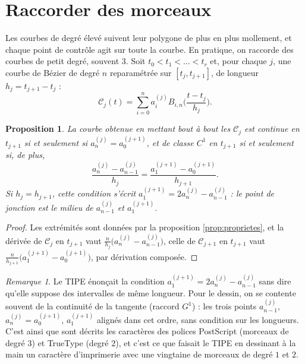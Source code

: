 \documentclass[11pt,a4paper]{article}
\theoremstyle{plain}
\newtheorem{proposition}[theoreme]{Proposition}
\theoremstyle{definition}
\theoremstyle{remark}
\newtheorem{remarque}[theoreme]{Remarque}
\newcommand{\C}{\mathcal{C}}
\begin{document}
\section{Raccorder des morceaux}

Les courbes de degré élevé suivent leur polygone de plus en plus mollement, et chaque point de contrôle agit sur toute la courbe. En pratique, on raccorde des courbes de petit degré, souvent $3$. Soit $t_0<t_1<\dots<t_r$ et, pour chaque $j$, une courbe de Bézier de degré $n$ reparamétrée sur $[t_j,t_{j+1}]$, de longueur $h_j=t_{j+1}-t_j$ :
\[
  \C_j(t)=\sum_{i=0}^na_i^{(j)}B_{i,n}\Big(\frac{t-t_j}{h_j}\Big) .
\]

\begin{proposition}\label{prop:raccord}
La courbe obtenue en mettant bout à bout les $\C_j$ est continue en $t_{j+1}$ si et seulement si $a_n^{(j)}=a_0^{(j+1)}$, et de classe $C^1$ en $t_{j+1}$ si et seulement si, de plus,
\[
  \frac{a_n^{(j)}-a_{n-1}^{(j)}}{h_j}=\frac{a_1^{(j+1)}-a_0^{(j+1)}}{h_{j+1}} .
\]
Si $h_j=h_{j+1}$, cette condition s'écrit $a_1^{(j+1)}=2a_n^{(j)}-a_{n-1}^{(j)}$ : le point de jonction est le milieu de $a_{n-1}^{(j)}$ et $a_1^{(j+1)}$.
\end{proposition}

\begin{proof}
Les extrémités sont données par la proposition \ref{prop:proprietes}, et la dérivée de $\C_j$ en $t_{j+1}$ vaut $\frac n{h_j}\big(a_n^{(j)}-a_{n-1}^{(j)}\big)$, celle de $\C_{j+1}$ en $t_{j+1}$ vaut $\frac n{h_{j+1}}\big(a_1^{(j+1)}-a_0^{(j+1)}\big)$, par dérivation composée.
\end{proof}

\begin{remarque}
Le TIPE énonçait la condition $a_1^{(j+1)}=2a_n^{(j)}-a_{n-1}^{(j)}$ sans dire qu'elle suppose des intervalles de même longueur. Pour le dessin, on se contente souvent de la continuité de la tangente (raccord $G^1$) : les trois points $a_{n-1}^{(j)}$, $a_n^{(j)}=a_0^{(j+1)}$, $a_1^{(j+1)}$ alignés dans cet ordre, sans condition sur les longueurs. C'est ainsi que sont décrits les caractères des polices PostScript (morceaux de degré $3$) et TrueType (degré $2$), et c'est ce que faisait le TIPE en dessinant à la main un caractère d'imprimerie avec une vingtaine de morceaux de degré $1$ et $2$.
\end{remarque}
\end{document}
